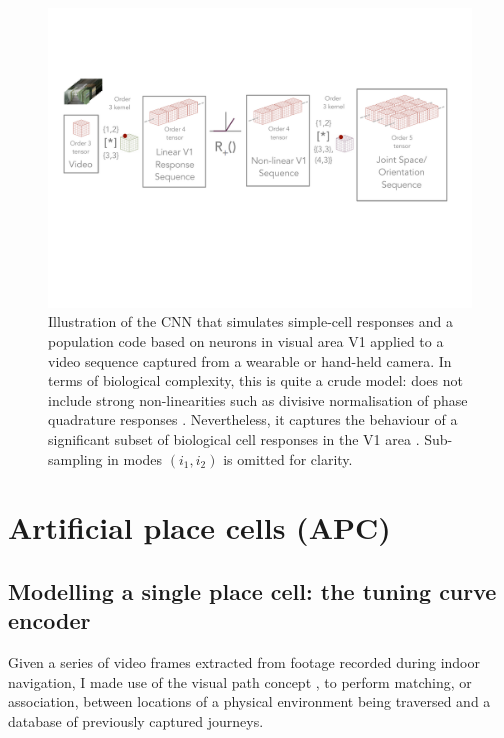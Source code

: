 \begin{figure}
\centering
\includegraphics[width=1.1\linewidth,trim={0 7cm 0 3cm},clip]{gfx/Chapter05/video_encoding_pipeline.pdf}
\caption{Illustration of the CNN that simulates simple-cell responses and a population code based on neurons in visual area V1 applied to a video sequence captured from a wearable or hand-held camera.  In terms of biological complexity, this is quite a crude model: does not include strong non\--linearities such as divisive normalisation of phase quadrature
responses \cite{petrou2008next}. Nevertheless, it captures the behaviour of a significant subset of biological cell responses in the V1 area \cite{carandini1997predictions}. Sub-sampling in modes $(i_1,i_2)$ is omitted for clarity.}
\label{fig:arch}
\end{figure}

\section{Artificial place cells (APC)}

\subsection{Modelling a single place cell: the tuning curve encoder}

Given a series of video frames extracted from footage recorded during indoor navigation, I made use of the visual path concept \cite{RiveraWearable, matsumoto1996visual, ohno1996autonomous}, to perform  matching, or association, between locations of a physical environment being traversed and a database of previously captured journeys.

